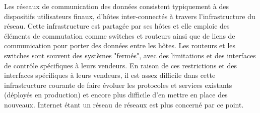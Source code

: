 Les réseaux de communication des données consistent typiquement à des dispositifs utilisateurs finaux, d'hôtes inter-connectés à travers l'infrastructure du réseau. Cette infrastructure est partagée par ses hôtes et elle emploie des éléments de commutation comme switches et routeurs ainsi que de liens de communication pour porter des données entre les hôtes. Les routeurs et les switches sont souvent des systèmes "fermés", avec des limitations et des interfaces de contrôle spécifiques à leurs vendeurs. 
En raison de ces restrictions et des interfaces spécifiques à leurs vendeurs, il est assez difficile dans cette infrastructure courante de faire évoluer les protocoles et services existants (déployés en production) et encore plus difficile d'en mettre en place des nouveaux.
Internet étant un réseau de réseaux est plus concerné par ce point. \cite{SurveySDNArchi}






